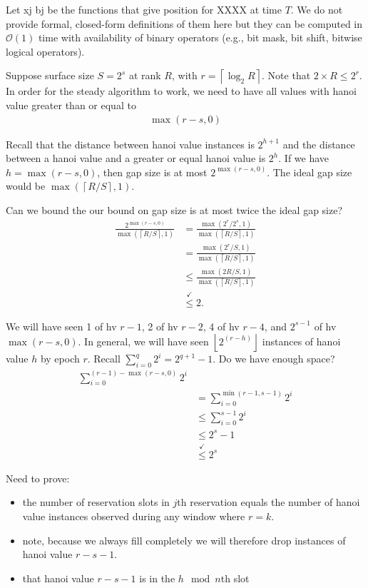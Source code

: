 Let xj bj be the functions that give position for XXXX at time $T$.
We do not provide formal, closed-form definitions of them here but they can be computed in $\mathcal{O}(1)$ time with availability of binary operators (e.g., bit mask, bit shift, bitwise logical operators).


Suppose surface size $S = 2^s$ at rank $R$, with $r = \left\lceil \log_2 R \right\rceil$.
Note that $2 \times R \leq 2^r$.
In order for the steady algorithm to work, we need to have all values with hanoi value greater than or equal to
\begin{align*}
\max(r - s, 0)
\end{align*}

Recall that the distance between hanoi value instances is $2^{h + 1}$ and the distance between a hanoi value and a greater or equal hanoi value is $2^h$.
If we have $h = \max (r - s, 0)$, then gap size is at most $2^{\max(r - s, 0)}$.
The ideal gap size would be $\max( \left\lceil R / S \right\rceil, 1)$.

Can we bound the our bound on gap size is at most twice the ideal gap size?
\begin{align*}
\frac{
  2^{\max(r - s, 0)}
}{
  \max(\left\lceil R / S \right\rceil, 1)
}
&=
\frac{
  \max(2^r / 2^s, 1)
}{
  \max(\left\lceil R / S \right\rceil, 1)
} \\
&=
\frac{
  \max(2^r / S, 1)
}{
  \max(\left\lceil R / S \right\rceil, 1)
} \\
&\leq
\frac{
  \max(2R / S, 1)
}{
  \max(\left\lceil R / S \right\rceil, 1)
} \\
&\stackrel{\checkmark}{\leq} 2.
\end{align*}

We will have seen 1 of hv $r - 1$, 2 of hv $r - 2$, 4 of hv $r - 4$, and $2 ^ {s - 1}$ of hv $\max(r - s, 0)$.
In general, we will have seen $\left\lfloor 2 ^ (r - h) \right\rfloor$ instances of hanoi value $h$ by epoch $r$.
Recall $\sum_{i = 0}^{q} 2^i = 2 ^ {q + 1} - 1$.
Do we have enough space?
\begin{align*}
\sum_{i = 0}^{(r - 1) - \max(r - s, 0)} 2 ^ i \\
&= \sum_{i = 0}^{\min(r - 1, s - 1)} 2 ^ i \\
&\leq \sum_{i = 0}^{s - 1} 2 ^ i \\
&\leq 2^s - 1\\
&\stackrel{\checkmark}{\leq} 2^s
\end{align*}

Need to prove:
\begin{itemize}
\item the number of reservation slots in $j$th reservation equals the number of hanoi value instances observed during any window where $r = k$.
\item note, because we always fill completely we will therefore drop instances of hanoi value $r - s - 1$.
\item that hanoi value $r - s - 1$ is in the $h \mod n$th slot
\end{itemize}

